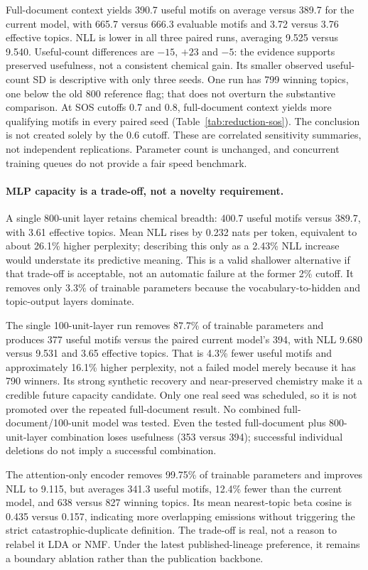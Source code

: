 \documentclass[10pt,a4paper]{article}
\begin{document}
Full-document context yields 390.7 useful motifs on average versus 389.7 for
the current model, with 665.7 versus 666.3 evaluable motifs and 3.72 versus
3.76 effective topics. NLL is lower in all three paired runs, averaging
9.525 versus 9.540. Useful-count differences are $-15$, $+23$ and $-5$:
the evidence supports preserved usefulness, not a consistent chemical gain.
Its smaller observed useful-count SD is descriptive with only three seeds.
One run has 799 winning topics, one below the old 800 reference flag; that
does not overturn the substantive comparison. At SOS cutoffs 0.7 and 0.8,
full-document context yields more qualifying motifs in every paired seed
(Table~\ref{tab:reduction-sos}). The conclusion is not created solely by the
0.6 cutoff. These are correlated sensitivity summaries, not independent
replications. Parameter count is unchanged, and concurrent training queues
do not provide a fair speed benchmark.

\paragraph{MLP capacity is a trade-off, not a novelty requirement.}
A single 800-unit layer retains chemical breadth: 400.7 useful motifs versus
389.7, with 3.61 effective topics. Mean NLL rises by 0.232 nats per token,
equivalent to about 26.1\% higher perplexity; describing this only as a
2.43\% NLL increase would understate its predictive meaning. This is a valid
shallower alternative if that trade-off is acceptable, not an automatic
failure at the former 2\% cutoff. It removes only 3.3\% of trainable parameters
because the vocabulary-to-hidden and topic-output layers dominate.

The single 100-unit-layer run removes 87.7\% of trainable parameters and
produces 377 useful motifs versus the paired current model's 394, with NLL
9.680 versus 9.531 and 3.65 effective topics. That is 4.3\% fewer useful motifs
and approximately 16.1\% higher perplexity, not a failed model merely because
it has 790 winners. Its strong synthetic recovery and near-preserved chemistry
make it a credible future capacity candidate. Only one real seed was scheduled,
so it is not promoted over the repeated full-document result. No combined
full-document/100-unit model was tested. Even the tested full-document plus
800-unit-layer combination loses usefulness (353 versus 394); successful
individual deletions do not imply a successful combination.

The attention-only encoder removes 99.75\% of trainable parameters and improves
NLL to 9.115, but averages 341.3 useful motifs, 12.4\% fewer than the current
model, and 638 versus 827 winning topics. Its mean nearest-topic beta cosine
is 0.435 versus 0.157, indicating more overlapping emissions without triggering
the strict catastrophic-duplicate definition. The trade-off is real, not a
reason to relabel it LDA or NMF. Under the latest published-lineage preference,
it remains a boundary ablation rather than the publication backbone.
\end{document}
